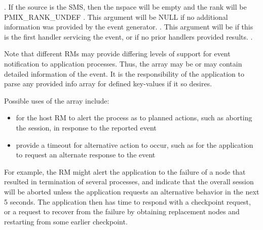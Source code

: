 \begin{arglist}
. If the source is the \ac{SMS}, then the nspace will be empty and the rank will be PMIX_RANK_UNDEF
. This argument will be NULL if no additional information was provided by the event generator.
. This argument will be  if this is the first handler servicing the event, or if no prior handlers provided results.
.
\end{arglist}

\descr

Note that different \acp{RM} may provide differing levels of support for event notification to application processes. Thus, the  array may be  or may contain detailed information of the event. It is the responsibility of the application to parse any provided info array for defined key-values if it so desires.

\adviceuserstart
Possible uses of the  array include:

\begin{itemize}
\item for the host \ac{RM} to alert the process as to planned actions, such as aborting the session, in response to the reported event

\item provide a timeout for alternative action to occur, such as for the application to request an alternate response to the event
\end{itemize}

For example, the \ac{RM} might alert the application to the failure of a node that resulted in termination of several processes, and indicate that the overall session will be aborted unless the application requests an alternative behavior in the next 5 seconds. The application then has time to respond with a checkpoint request, or a request to recover from the failure by obtaining replacement nodes and restarting from some earlier checkpoint.

